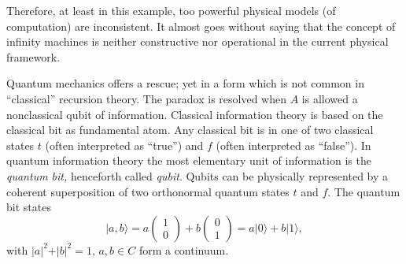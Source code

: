 Therefore, at least in this example, too powerful physical models (of
computation) are inconsistent.
It almost goes without saying that the concept of infinity
machines is neither constructive nor operational in the current physical
framework.



Quantum mechanics offers a rescue;
yet in a form which is not common in ``classical'' recursion theory.
The paradox is resolved when
$A$ is allowed a nonclassical qubit of information.
Classical information theory is based on the
classical bit as
fundamental atom.
Any classical bit is in one of two
classical states $t$ (often interpreted as ``true'') and $f$ (often
interpreted as ``false'').
In quantum information theory
the most elementary unit of information is
 the {\em quantum bit,}
henceforth called {\em qubit}.
Qubits can be physically represented by a coherent
superposition
of two orthonormal quantum
 states $t$ and $f$.
The quantum bit states
$$
\vert a,b\rangle
=
a\left( \begin{array}{c}1\\ 0\end{array} \right)+
b\left( \begin{array}{c}0\\ 1\end{array} \right)
=
a\vert 0\rangle +b\vert 1 \rangle ,
$$
with
$ \vert a\vert^2+\vert b\vert^2=1$, $a,b\in { C}$
form a continuum.

